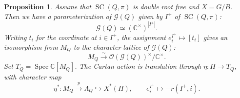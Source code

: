 \documentclass[11pt,a4paper]{article}
\newtheorem{proposition}[theorem]{Proposition}
\theoremstyle{definition}
\theoremstyle{remark}
\newcommand{\SC}{\operatorname{SC}}
\numberwithin{equation}{section}
\newcommand{\SCQ}{\operatorname{SC}(Q,\pi)}
\newcommand{\C}{\mathbb C}
\newcommand{\Spec}{\operatorname{Spec}}
\begin{document}
\begin{proposition}\label{prop:complex-torus}
Assume that $\SC(Q,\pi)$ is double root free and $X=G/B$. Then we have a parameterization of $\mathcal{G}(Q)$ given by $I^+$ of $\SCQ$:
\[
\mathcal G(Q)\simeq(\C^\times)^{|I^+|}.
\]
Writing $t_i$ for the coordinate at $i\in I^+$, the assignment $e_i^{I^+}\mapsto[t_i]$ gives an isomorphism from $M_Q$ to the character lattice of $\mathcal G(Q)$:
\begin{equation}\label{eq:character-identification}
M_Q\xrightarrow{\sim}\mathcal O(\mathcal G(Q))^\times/\C^\times.
\end{equation}
Set $T_Q=\Spec\C[M_Q]$. The Cartan action is translation through
$\eta:H\to T_Q$, with character map
\[
\eta^*:M_Q\xrightarrow{\,p\,}\Lambda_Q\hookrightarrow X^*(H),
\qquad e_i^{I^+}\longmapsto-r(I^+,i).
\]
\end{proposition}
\end{document}
